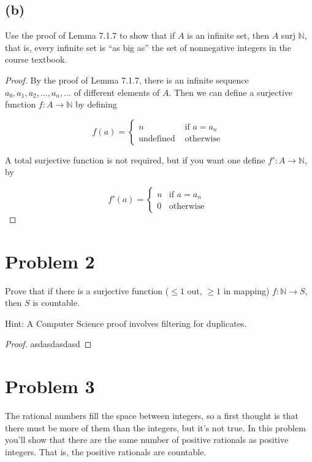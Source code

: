 \documentclass[14pt]{extarticle}
\begin{document}
\subsection{(b)}
Use the proof of Lemma 7.1.7 to show that if $A$ is an infinite set, then $A$ surj $\mathbb{N}$, that is, every infinite set is “as big as” the set of nonnegative integers in the course textbook.
\begin{proof}
By the proof of Lemma 7.1.7, there is an infinite sequence $a_0, a_1, a_2, \ldots, a_n, \ldots$ of differ­ent elements of $A$. Then we can define a surjective function $f: A \to \mathbb{N}$ by defining

\begin{displaymath}
   f(a) = \left\{
     \begin{array}{lr}
       n & \text{ if } a = a_n\\
       \text{undefined} & \text{ otherwise }
     \end{array}
   \right.
\end{displaymath}

A total surjective function is not required, but if you want one define $f': A \to \mathbb{N}$, by

\begin{displaymath}
   f'(a) = \left\{
     \begin{array}{lr}
       n & \text{if } a = a_n\\
       0 & \text{otherwise }
     \end{array}
   \right.
\end{displaymath}
\end{proof}

\section{Problem 2}
Prove that if there is a surjective function ($\leq 1$ out, $\geq 1$ in mapping) $f:\mathbb{N}\to S$, then $S$ is countable.

Hint: A Computer Science proof involves filtering for duplicates.

\begin{proof}
asdasdasdasd
\end{proof}

\section{Problem 3}
The rational numbers fill the space between integers, so a first thought is that there must be more of them than the integers, but it’s not true. In this problem you’ll show that there are the same number of positive rationals as positive integers. That is, the positive rationals are countable.
\end{document}
